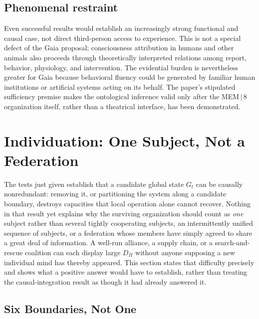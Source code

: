 \documentclass[11pt]{article}
\begin{document}
\subsection{Phenomenal restraint}

Even successful results would establish an increasingly strong functional and causal case, not direct third-person access to experience. This is not a special defect of the Gaia proposal; consciousness attribution in humans and other animals also proceeds through theoretically interpreted relations among report, behavior, physiology, and intervention. The evidential burden is nevertheless greater for Gaia because behavioral fluency could be generated by familiar human institutions or artificial systems acting on its behalf. The paper's stipulated sufficiency premise makes the ontological inference valid only after the MEM\,$|$\,8 organization itself, rather than a theatrical interface, has been demonstrated.

\section{Individuation: One Subject, Not a Federation}
\label{sec:individuation}

The tests just given establish that a candidate global state $G_t$ can be causally nonredundant: removing it, or partitioning the system along a candidate boundary, destroys capacities that local operation alone cannot recover. Nothing in that result yet explains why the surviving organization should count as \emph{one} subject rather than several tightly cooperating subjects, an intermittently unified sequence of subjects, or a federation whose members have simply agreed to share a great deal of information. A well-run alliance, a supply chain, or a search-and-rescue coalition can each display large $D_\Pi$ without anyone supposing a new individual mind has thereby appeared. This section states that difficulty precisely and shows what a positive answer would have to establish, rather than treating the causal-integration result as though it had already answered it.

\subsection{Six Boundaries, Not One}
\end{document}
